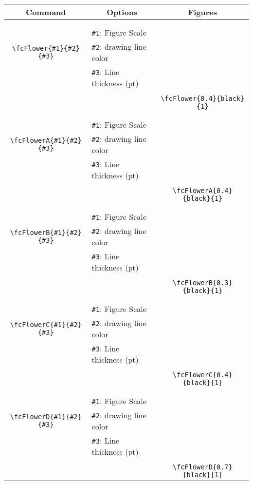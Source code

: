 \documentclass[x11names]{article}
\begin{document}
\begin{table}[H]\centering\begin{tabular}{|c|l|c|}\hline {\bf Command}& \multicolumn{1}{c|}{{\bf Options}} & {\bf Figures}\\  \hline	&&\multirow{5}{*}{\fcFlower{0.4}{black}{1}}\\	&&\\	&\verb|#1|: Figure Scale &\\	\verb|\fcFlower{#1}{#2}{#3}|&	\verb|#2|: drawing line color &\\	&\verb|#3|: Line thickness (pt) &\\ &&\\&&	\verb|\fcFlower{0.4}{black}{1}|\\\hline 	
	&&\multirow{5}{*}{\fcFlowerA{0.4}{black}{1}}\\	&&\\	&\verb|#1|: Figure Scale &\\	\verb|\fcFlowerA{#1}{#2}{#3}|&	\verb|#2|: drawing line color &\\	&\verb|#3|: Line thickness (pt) &\\ &&\\&&	\verb|\fcFlowerA{0.4}{black}{1}|\\\hline 	
	&&\multirow{5}{*}{\fcFlowerB{0.3}{black}{1}}\\	&&\\	&\verb|#1|: Figure Scale &\\	\verb|\fcFlowerB{#1}{#2}{#3}|&	\verb|#2|: drawing line color &\\	&\verb|#3|: Line thickness (pt) &\\ &&\\&&	\verb|\fcFlowerB{0.3}{black}{1}|\\\hline 	
	&&\multirow{5}{*}{\fcFlowerC{0.4}{black}{1}}\\	&&\\	&\verb|#1|: Figure Scale &\\	\verb|\fcFlowerC{#1}{#2}{#3}|&	\verb|#2|: drawing line color &\\	&\verb|#3|: Line thickness (pt) &\\ &&\\&&	\verb|\fcFlowerC{0.4}{black}{1}|\\\hline 	
	&&\multirow{5}{*}{\fcFlowerD{0.7}{black}{1}}\\	&&\\	&\verb|#1|: Figure Scale &\\	\verb|\fcFlowerD{#1}{#2}{#3}|&	\verb|#2|: drawing line color &\\	&\verb|#3|: Line thickness (pt) &\\ &&\\&&	\verb|\fcFlowerD{0.7}{black}{1}|\\\hline 	

\end{tabular}
\end{table}
\end{document}
